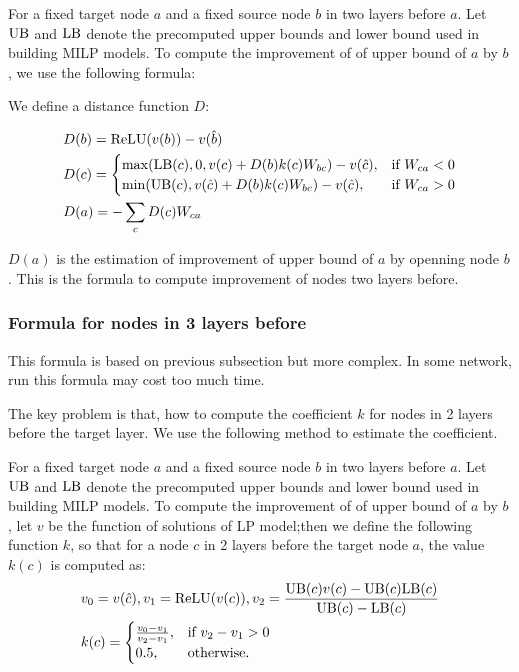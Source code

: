 \begin{definition}
	For a fixed target node $a$ and a fixed source node $b$ in two layers before $a$. Let $\mathrm{UB}$ and $\mathrm{LB}$ denote the precomputed upper bounds and lower bound used in building MILP models. To compute the improvement of of upper bound of $a$ by $b$, we use the following formula:
	
	We define a distance function $D$:
	
	\begin{align*}
		&D(b) = \mathrm{ReLU}(v(b))-v(\hat{b})\\
			&D(c) =
		\begin{cases}
			\max(\mathrm{LB}(c), 0, v(c)+D(b)k(c)W_{bc})-v(\hat{c}), & \text{if }W_{ca} < 0\\
			\min(\mathrm{UB}(c), v(\hat{c})+D(b)k(c)W_{bc})-v(\hat{c}), & \text{if }  W_{ca} > 0
		\end{cases}\\
		&D(a) = -\sum_c D(c)W_{ca}
	\end{align*}
\end{definition}

$D(a)$ is the estimation of improvement of upper bound of $a$ by openning node $b$. This is the formula to compute improvement of nodes two layers before.


\subsubsection*{Formula for nodes in 3 layers before} 

This formula is based on previous subsection but more complex. In some network, run this formula may cost too much time. 

The key problem is that, how to compute the coefficient $k$ for nodes in 2 layers before the target layer. We use the following method to estimate the coefficient.

\begin{definition}\label{3layer}
	For a fixed target node $a$ and a fixed source node $b$ in two layers before $a$. Let $\mathrm{UB}$ and $\mathrm{LB}$ denote the precomputed upper bounds and lower bound used in building MILP models. To compute the improvement of of upper bound of $a$ by $b$, let $v$ be the function of solutions of LP model;then we define the following function $k$, so that for a node $c$ in 2 layers before the target node $a$, the value $k(c)$ is computed as:
	\begin{align*}
		&v_0 = v(\hat{c}), v_1 = \mathrm{ReLU}(v(c)), v_2 = \frac{\mathrm{UB}(c)v(c)-\mathrm{UB}(c)\mathrm{LB}(c)}{\mathrm{UB}(c)-\mathrm{LB}(c)}\\
		&k(c) =
		\begin{cases}
			\frac{v_0-v_1}{v_2-v_1}, & \text{if } v_2-v_1 > 0\\
			0.5, & \text{otherwise.}
		\end{cases}
	\end{align*} 
\end{definition} 

